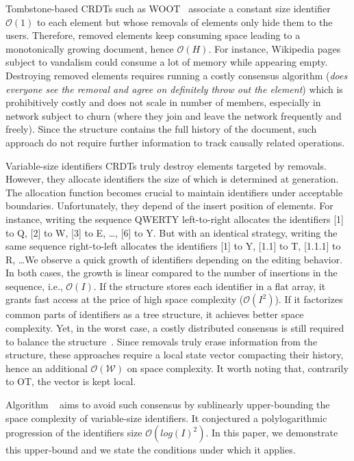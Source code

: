 \begin{asparadesc}
\item [Tombstone-based] CRDTs such as WOOT~\cite{oster2006data} associate a
  constant size identifier $\mathcal{O}(1)$ to each element but whose removals
  of elements only hide them to the users. Therefore, removed elements keep
  consuming space leading to a monotonically growing document, hence
  $\mathcal{O}(H)$. For instance, Wikipedia pages subject to vandalism could
  consume a lot of memory while appearing empty. Destroying removed elements
  requires running a costly consensus algorithm (\emph{does everyone see the
    removal and agree on definitely throw out the element}) which is
  prohibitively costly and does not scale in number of members, especially in
  network subject to churn (where they join and leave the network frequently and
  freely). Since the structure contains the full history of the document, such
  approach do not require further information to track causally related
  operations.

\item [Variable-size identifiers] CRDTs truly destroy elements targeted by
  removals. However, they allocate identifiers the size of which is determined
  at generation. The allocation function becomes crucial to maintain identifiers
  under acceptable boundaries. Unfortunately, they depend of the insert position
  of elements. For instance, writing the sequence QWERTY left-to-right allocates
  the identifiers [1] to Q, [2] to W, [3] to E, \ldots, [6] to Y. But with an
  identical strategy, writing the same sequence right-to-left allocates the
  identifiers [1] to Y, [1.1] to T, [1.1.1] to R, \ldots We observe a quick
  growth of identifiers depending on the editing behavior. In both cases, the
  growth is linear compared to the number of insertions in the sequence, i.e.,
  $\mathcal{O}(I)$. If the structure stores each identifier in a flat array, it
  grants fast access at the price of high space complexity
  ($\mathcal{O}(I^2)$). If it factorizes common parts of identifiers as a tree
  structure, it achieves better space complexity. Yet, in the worst case, a
  costly distributed consensus is still required to balance the
  structure~\cite{zawirski2011asynchronous}. Since removals truly erase
  information from the structure, these approaches require a local state vector
  compacting their history, hence an additional $\mathcal{\mathcal{O}(W)}$ on
  space complexity. It worth noting that, contrarily to OT, the vector is kept
  local.

  Algorithm \LSEQ~\cite{nedelec2013lseq} aims to avoid such consensus by
  sublinearly upper-bounding the space complexity of variable-size
  identifiers. It conjectured a polylogarithmic progression of the identifiers
  size $\mathcal{O}(log(I)^2)$. In this paper, we demonstrate this upper-bound
  and we state the conditions under which it applies.

\end{asparadesc}

